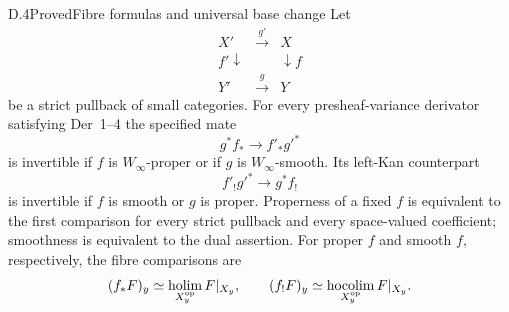 \begin{statement}{D.4}{Proved}{Fibre formulas and universal base change}
Let
\[
 \begin{array}{ccc}
 X'&\xrightarrow{g'}&X\\
 {\scriptstyle f'}\downarrow&&\downarrow{\scriptstyle f}\\
 Y'&\xrightarrow{g}&Y
 \end{array}
\]
be a strict pullback of small categories. For every presheaf-variance derivator satisfying Der~1--4 the specified mate
\[
 g^*f_*\longrightarrow f'_*g'^*
\]
is invertible if $f$ is $W_\infty$-proper or if $g$ is $W_\infty$-smooth. Its left-Kan counterpart
\[
 f'_!g'^*\longrightarrow g^*f_!
\]
is invertible if $f$ is smooth or $g$ is proper. Properness of a fixed $f$ is equivalent to the first comparison for every strict pullback and every space-valued coefficient; smoothness is equivalent to the dual assertion. For proper $f$ and smooth $f$, respectively, the fibre comparisons are
\[
 (f_*F)_y\simeq\operatorname*{holim}_{X_y^{\mathrm{op}}}F|_{X_y},
 \qquad
 (f_!F)_y\simeq\operatorname*{hocolim}_{X_y^{\mathrm{op}}}F|_{X_y}.
\]
\end{statement}
